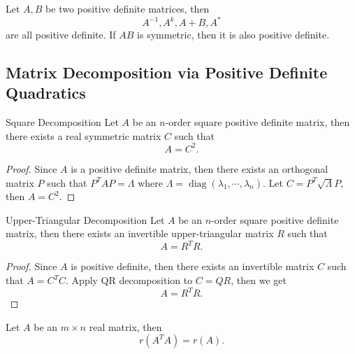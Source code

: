\begin{proposition}{}{}
  Let $A, B$ be two positive definite matrices,
  then
  \begin{equation}
    A^{-1}, A^k, A+B, A^{\ast}
  \end{equation}
  are all positive definite.
  If $AB$ is symmetric, then it is also positive definite.
\end{proposition}

\subsection{Matrix Decomposition via Positive Definite Quadratics}

\begin{proposition}{Square Decomposition}{}
  Let $A$ be an $n$-order square positive definite matrix,
  then there exists a real symmetric matrix $C$ such that
  \begin{equation}
    A = C^2.
  \end{equation}
\end{proposition}

\begin{proof}
  Since $A$ is a positive definite matrix, then there exists an
  orthogonal matrix $P$ such that
  $P^TAP = \Lambda$ where $\Lambda =
  \operatorname{diag}(\lambda_1,\cdots,\lambda_n)$.
  Let $C = P^T \sqrt{\Lambda} P$, then $A = C^2$.
\end{proof}

\begin{proposition}{Upper-Triangular Decomposition}{}
  Let $A$ be an $n$-order square positive definite matrix,
  then there exists an invertible upper-triangular matrix $R$ such that
  \begin{equation}
    A = R^TR.
  \end{equation}
\end{proposition}

\begin{proof}
  Since $A$ is positive definite, then there exists an invertible matrix $C$
  such that $A = C^TC$.
  Apply QR decomposition to $C = QR$, then we get
  \begin{equation}
    A = R^TR.
  \end{equation}
\end{proof}

\begin{lemma}{}{}
  Let $A$ be an $m \times n$ real matrix, then
  \begin{equation}
    r(A^TA) = r(A).
  \end{equation}
\end{lemma}

